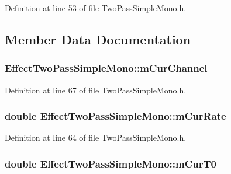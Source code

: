 Definition at line 53 of file Two\+Pass\+Simple\+Mono.\+h.



\subsection{Member Data Documentation}
\subsubsection[{\texorpdfstring{m\+Cur\+Channel}{mCurChannel}}]{ Effect\+Two\+Pass\+Simple\+Mono\+::m\+Cur\+Channel\hspace{0.3cm}{\ttfamily [protected]}}\hypertarget{class_effect_two_pass_simple_mono_a130a4d76f50159155601968d86f0014b}{}\label{class_effect_two_pass_simple_mono_a130a4d76f50159155601968d86f0014b}


Definition at line 67 of file Two\+Pass\+Simple\+Mono.\+h.

\subsubsection[{\texorpdfstring{m\+Cur\+Rate}{mCurRate}}]{\setlength{\rightskip}{0pt plus 5cm}double Effect\+Two\+Pass\+Simple\+Mono\+::m\+Cur\+Rate\hspace{0.3cm}{\ttfamily [protected]}}\hypertarget{class_effect_two_pass_simple_mono_a69e39749b514b947a31cb80068c4788e}{}\label{class_effect_two_pass_simple_mono_a69e39749b514b947a31cb80068c4788e}


Definition at line 64 of file Two\+Pass\+Simple\+Mono.\+h.

\subsubsection[{\texorpdfstring{m\+Cur\+T0}{mCurT0}}]{\setlength{\rightskip}{0pt plus 5cm}double Effect\+Two\+Pass\+Simple\+Mono\+::m\+Cur\+T0\hspace{0.3cm}{\ttfamily [protected]}}\hypertarget{class_effect_two_pass_simple_mono_a8aeacbef81efa1920a5c064776882521}{}\label{class_effect_two_pass_simple_mono_a8aeacbef81efa1920a5c064776882521}


